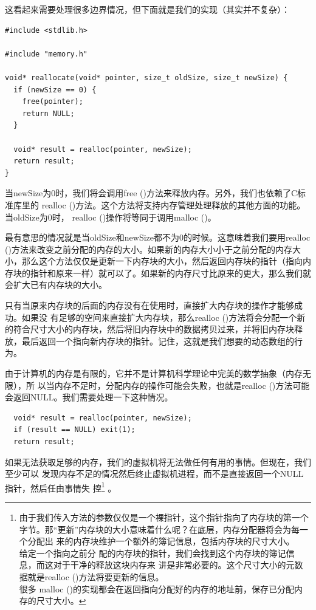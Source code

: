 \documentclass[cn,10pt,math=newtx,citestyle=gb7714-2015,bibstyle=gb7714-2015]{elegantbook}
\newenvironment{code}{\captionsetup{type=listing}}{}
\begin{document}
这看起来需要处理很多边界情况，但下面就是我们的实现（其实并不复杂）：

\begin{code}
\begin{verbatim}
#include <stdlib.h>

#include "memory.h"

void* reallocate(void* pointer, size_t oldSize, size_t newSize) {
  if (newSize == 0) {
    free(pointer);
    return NULL;
  }

  void* result = realloc(pointer, newSize);
  return result;
}
\end{verbatim}
\end{code}

当newSize为0时，我们将会调用free ()方法来释放内存。另外，我们也依赖了C标准库里的
realloc ()方法。这个方法将支持内存管理处理释放的其他方面的功能。当oldSize为0时，
realloc ()操作将等同于调用malloc ()。

最有意思的情况就是当oldSize和newSize都不为0的时候。这意味着我们要用realloc ()方法来改变之前分配的内存的大小。如果新的内存大小小于之前分配的内存大小，那么这个方法仅仅是更新一下内存块的大小，然后返回内存块的指针（指向内存块的指针和原来一样）就可以了。如果新的内存尺寸比原来的更大，那么我们就会扩大已有内存块的大小。

只有当原来内存块的后面的内存没有在使用时，直接扩大内存块的操作才能够成功。如果没
有足够的空间来直接扩大内存块，那么realloc ()方法将会分配一个新的符合尺寸大小的内存块，然后将旧内存块中的数据拷贝过来，并将旧内存块释放，最后返回一个指向新内存块的指针。记住，这就是我们想要的动态数组的行为。

由于计算机的内存是有限的，它并不是计算机科学理论中完美的数学抽象（内存无限），所
以当内存不足时，分配内存的操作可能会失败，也就是realloc ()方法可能会返回NULL。我们需要处理一下这种情况。

\begin{code}
\begin{verbatim}
  void* result = realloc(pointer, newSize);
  if (result == NULL) exit(1);
  return result;
\end{verbatim}
\end{code}

如果无法获取足够的内存，我们的虚拟机将无法做任何有用的事情。但现在，我们至少可以
发现内存不足的情况然后终止虚拟机进程，而不是直接返回一个NULL指针，然后任由事情失
控\footnote{由于我们传入方法的参数仅仅是一个裸指针，这个指针指向了内存块的第一个
  字节。那“更新”内存块的大小意味着什么呢？在底层，内存分配器将会为每一个分配出
  来的内存块维护一个额外的簿记信息，包括内存块的尺寸大小。 \\ 给定一个指向之前分
  配的内存块的指针，我们会找到这个内存块的簿记信息，而这对于干净的释放这块内存来
  讲是非常必要的。这个尺寸大小的元数据就是realloc ()方法将要更新的信息。 \\ 很多
  malloc ()的实现都会在返回指向分配好的内存的地址前，保存已分配内存的尺寸大小。} 。
\end{document}
